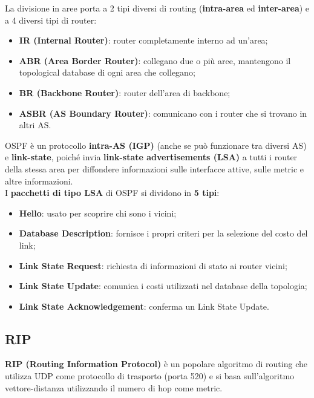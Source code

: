 \documentclass{article}
\begin{document}
        La divisione in aree porta a 2 tipi diversi di routing (\textbf{intra-area} ed \textbf{inter-area}) e a 4 diversi tipi
        di router:
        
        \begin{itemize}
            \item \textbf{IR (Internal Router)}: router completamente interno ad un’area;
            \item \textbf{ABR (Area Border Router)}: collegano due o più aree, mantengono il topological
            database di ogni area che collegano;
            \item \textbf{BR (Backbone Router)}: router dell’area di backbone;
            \item \textbf{ASBR (AS Boundary Router)}: comunicano con i router che si trovano in altri AS.
        \end{itemize}
        
        OSPF è un protocollo \textbf{intra-AS (IGP)} (anche se può funzionare tra diversi AS) e \textbf{link-state},
        poiché invia \textbf{link-state advertisements (LSA)} a tutti i router della stessa area per diffondere
        informazioni sulle interfacce attive, sulle metric e altre informazioni.\\
        
        I \textbf{pacchetti di tipo LSA} di OSPF si dividono in \textbf{5 tipi}:
        
        \begin{itemize}
            \item \textbf{Hello}: usato per scoprire chi sono i vicini;
            \item \textbf{Database Description}: fornisce i propri criteri per la selezione del costo del link;
            \item \textbf{Link State Request}: richiesta di informazioni di stato ai router vicini;
            \item \textbf{Link State Update}: comunica i costi utilizzati nel database della topologia;
            \item \textbf{Link State Acknowledgement}: conferma un Link State Update.
        \end{itemize}
        
        \subsection{RIP}
        \textbf{RIP (Routing Information Protocol)} è un popolare algoritmo di routing che utilizza UDP come
        protocollo di trasporto (porta 520) e si basa sull’algoritmo vettore-distanza utilizzando il
        numero di hop come metric.\\
        
\end{document}
